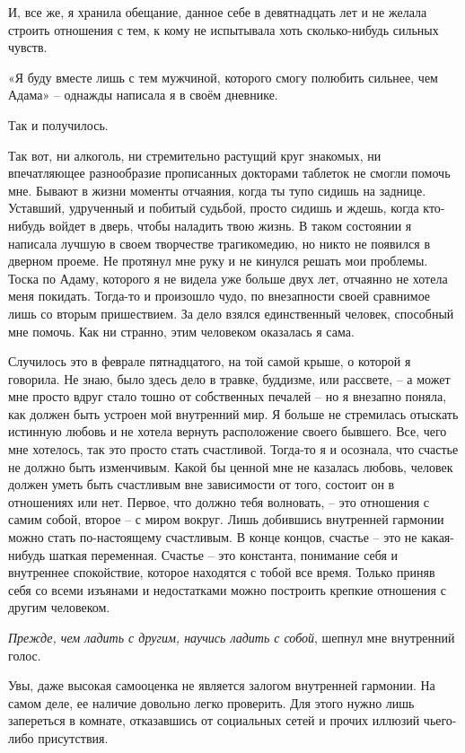 \documentclass[
]{book}
\begin{document}
И, все же, я хранила обещание, данное себе в девятнадцать лет и не желала строить отношения с тем, к кому не испытывала хоть сколько-нибудь сильных чувств.

«Я буду вместе лишь с тем мужчиной, которого смогу полюбить сильнее, чем Адама» -- однажды написала я в своём дневнике.

Так и получилось.

Так вот, ни алкоголь, ни стремительно растущий круг знакомых, ни впечатляющее разнообразие прописанных докторами таблеток не смогли помочь мне. Бывают в жизни моменты отчаяния, когда ты тупо сидишь на заднице. Уставший, удрученный и побитый судьбой, просто сидишь и ждешь, когда кто-нибудь войдет в дверь, чтобы наладить твою жизнь. В таком состоянии я написала лучшую в своем творчестве трагикомедию, но никто не появился в дверном проеме. Не протянул мне руку и не кинулся решать мои проблемы. Тоска по Адаму, которого я не видела уже больше двух лет, отчаянно не хотела меня покидать. Тогда-то и произошло чудо, по внезапности своей сравнимое лишь со вторым пришествием. За дело взялся единственный человек, способный мне помочь. Как ни странно, этим человеком оказалась я сама.

Случилось это в феврале пятнадцатого, на той самой крыше, о которой я говорила. Не знаю, было здесь дело в травке, буддизме, или рассвете, -- а может мне просто вдруг стало тошно от собственных печалей -- но я внезапно поняла, как должен быть устроен мой внутренний мир. Я больше не стремилась отыскать истинную любовь и не хотела вернуть расположение своего бывшего. Все, чего мне хотелось, так это просто стать счастливой. Тогда-то я и осознала, что счастье не должно быть изменчивым. Какой бы ценной мне не казалась любовь, человек должен уметь быть счастливым вне зависимости от того, состоит он в отношениях или нет. Первое, что должно тебя волновать, -- это отношения с самим собой, второе -- с миром вокруг. Лишь добившись внутренней гармонии можно стать по-настоящему счастливым. В конце концов, счастье -- это не какая-нибудь шаткая переменная. Счастье -- это константа, понимание себя и внутреннее спокойствие, которое находятся с тобой все время. Только приняв себя со всеми изъянами и недостатками можно построить крепкие отношения с другим человеком.

\emph{Прежде, чем ладить с другим, научись ладить с собой}, шепнул мне внутренний голос.

Увы, даже высокая самооценка не является залогом внутренней гармонии. На самом деле, ее наличие довольно легко проверить. Для этого нужно лишь запереться в комнате, отказавшись от социальных сетей и прочих иллюзий чьего-либо присутствия.
\end{document}
